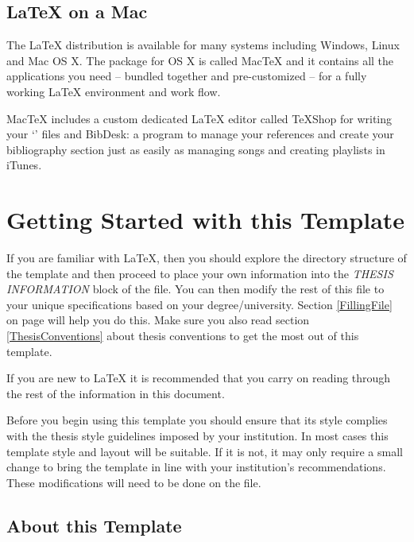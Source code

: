 \documentclass[
12pt, %
english, %
doublespacing, %
nolistspacing, %
liststotoc, %
headsepline, %
chapterinoneline, %
openany, %
]{DoctoralThesis}\usepackage[]{graphicx}\usepackage[]{color}
\begin{document}
\subsection{\LaTeX{} on a Mac}
 
The \LaTeX{} distribution is available for many systems including Windows, Linux and Mac OS X. The package for OS X is called MacTeX and it contains all the applications you need -- bundled together and pre-customized -- for a fully working \LaTeX{} environment and work flow.
 
MacTeX includes a custom dedicated \LaTeX{} editor called TeXShop for writing your `' files and BibDesk: a program to manage your references and create your bibliography section just as easily as managing songs and creating playlists in iTunes.


\section{Getting Started with this Template}

If you are familiar with \LaTeX{}, then you should explore the directory structure of the template and then proceed to place your own information into the \emph{THESIS INFORMATION} block of the  file. You can then modify the rest of this file to your unique specifications based on your degree/university. Section \ref{FillingFile} on page \pageref{FillingFile} will help you do this. Make sure you also read section \ref{ThesisConventions} about thesis conventions to get the most out of this template.

If you are new to \LaTeX{} it is recommended that you carry on reading through the rest of the information in this document.

Before you begin using this template you should ensure that its style complies with the thesis style guidelines imposed by your institution. In most cases this template style and layout will be suitable. If it is not, it may only require a small change to bring the template in line with your institution's recommendations. These modifications will need to be done on the  file.

\subsection{About this Template}
\end{document}
